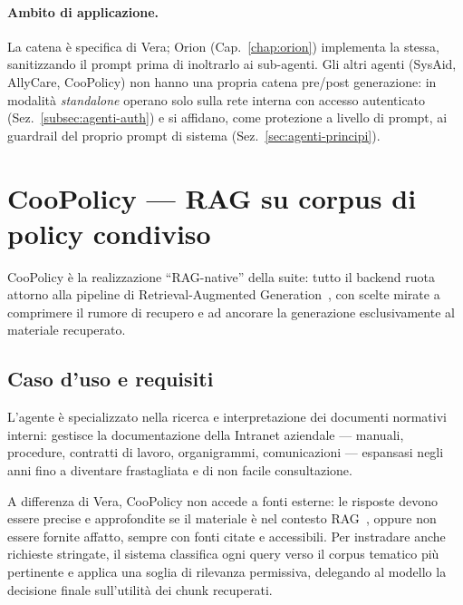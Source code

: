 \paragraph{Ambito di applicazione.}
La catena è specifica di Vera; Orion (Cap.~\ref{chap:orion}) implementa la stessa, sanitizzando il
prompt prima di inoltrarlo ai sub-agenti. Gli altri agenti (SysAid, AllyCare, CooPolicy) non hanno
una propria catena pre/post generazione: in modalità \emph{standalone} operano solo sulla rete
interna con accesso autenticato (Sez.~\ref{subsec:agenti-auth}) e si affidano, come protezione a
livello di prompt, ai guardrail del proprio prompt di sistema (Sez.~\ref{sec:agenti-principi}).

\section{CooPolicy --- RAG su corpus di policy condiviso}
\label{sec:agenti-coopolicy-arch}
\label{sec:agenti-coopolicy-impl}

CooPolicy è la realizzazione ``RAG-native'' della suite: tutto il backend
ruota attorno alla pipeline di Retrieval-Augmented
Generation~\cite{lewis2020rag}, con scelte mirate a comprimere il rumore di
recupero e ad ancorare la generazione esclusivamente al materiale recuperato.

\subsection{Caso d'uso e requisiti}
\label{subsec:coopolicy-caso-uso}

L'agente è specializzato nella ricerca e interpretazione dei documenti normativi interni: gestisce
la documentazione della Intranet aziendale --- manuali, procedure, contratti di lavoro, organigrammi,
comunicazioni --- espansasi negli anni fino a diventare frastagliata e di non facile consultazione.

A differenza di Vera, CooPolicy non accede a fonti esterne: le risposte devono essere precise e
approfondite se il materiale è nel contesto RAG~\cite{lewis2020rag,guu2020realm}, oppure non essere
fornite affatto, sempre con fonti citate e accessibili. Per instradare anche richieste stringate, il
sistema classifica ogni query verso il corpus tematico più pertinente e applica una soglia di
rilevanza permissiva, delegando al modello la decisione finale sull'utilità dei chunk recuperati.

